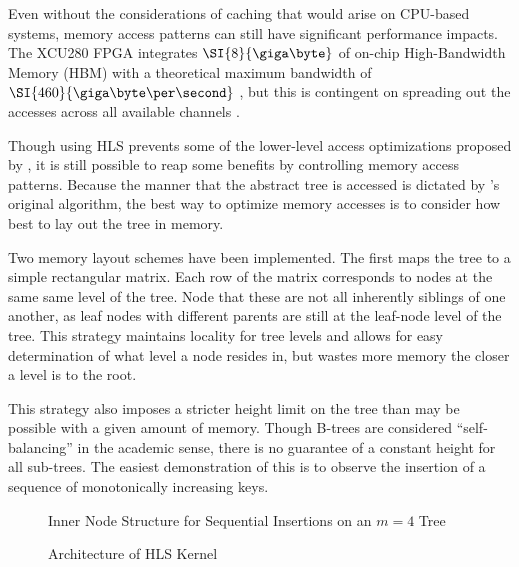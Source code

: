 \begin{figure}[H]
	\centering
	
\end{figure}

\begin{figure}[H]
	\centering
	
\end{figure}



Even without the considerations of caching that would arise on CPU-based
systems, memory access patterns can still have significant performance impacts.
The XCU280 FPGA integrates $\SI{8}{\giga\byte}$ of on-chip High-Bandwidth Memory
(HBM) with a theoretical maximum bandwidth of $\SI{460}{\giga\byte\per\second}$
\autocite{u280}, but this is contingent on spreading out the accesses across all
available channels \autocite{holzinger-ipdpsw-2021}.

Though using HLS prevents some of the lower-level access optimizations proposed
by \citeauthor{holzinger-ipdpsw-2021}, it is still possible to reap some
benefits by controlling memory access patterns. Because the manner that the
abstract tree is accessed is dictated by \citeauthor{b-link}'s original
algorithm, the best way to optimize memory accesses is to consider how best to
lay out the tree in memory.


\begin{figure}[H]
	\centering
	
\end{figure}

Two memory layout schemes have been implemented. The first maps the tree to a
simple rectangular matrix. Each row of the matrix corresponds to nodes at the
same same level of the tree. Node that these are not all inherently siblings of
one another, as leaf nodes with different parents are still at the leaf-node
level of the tree. This strategy maintains locality for tree levels and allows
for easy determination of what level a node resides in, but wastes more memory
the closer a level is to the root.

This strategy also imposes a stricter height limit on the tree than may be
possible with a given amount of memory. Though B-trees are considered
``self-balancing'' in the academic sense, there is no guarantee of a constant
height for all sub-trees. The easiest demonstration of this is to observe the
insertion of a sequence of monotonically increasing keys.

\begin{figure}[H]
	\centering
	
	\caption{Inner Node Structure for Sequential Insertions on an $m=4$ Tree}
\end{figure}



\begin{figure}[H]
	\centering
	
	\caption{Architecture of HLS Kernel}
\end{figure}
